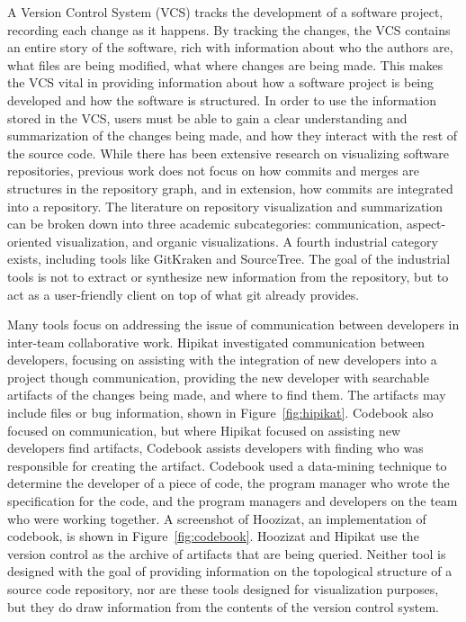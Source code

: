 A Version Control System (VCS) tracks the development of a software project,
recording each change as it happens. By tracking the changes, the VCS
contains an entire story of the software, rich with information about
who the authors are, what files are being modified, what where changes
are being made. This makes the VCS vital in providing information about
how a software project is being developed and how the software is
structured. In order to use the information stored in the VCS, users
must be able to gain a clear understanding and summarization of the
changes being made, and how they interact with the rest of the source
code. While there has been extensive research on visualizing software
repositories, previous work does not focus on how commits and merges are
structures in the repository graph, and in extension, how commits are
integrated into a repository. The literature on repository visualization
and summarization can be broken down into three academic subcategories:
communication\cite{Cubranic2005,Begel2010}, aspect-oriented
visualization\cite{Ambros2005,Burch2005,Ambros2009}, and organic
visualizations\cite{ogawa09,Caudwell2010}. A fourth industrial category
exists, including tools like GitKraken and SourceTree. The goal of the
industrial tools is not to extract or synthesize new information from
the repository, but to act as a user-friendly client on top of what git
already provides.

Many tools focus on addressing the issue of communication between
developers in inter-team collaborative work. Hipikat\cite{Cubranic2005}
investigated communication between developers, focusing on assisting
with the integration of new developers into a project though
communication, providing the new developer with searchable artifacts of
the changes being made, and where to find them. The artifacts may
include files or bug information, shown in Figure~\ref{fig:hipikat}.
Codebook\cite{Begel2010} also focused on communication, but where
Hipikat focused on assisting new developers find artifacts, Codebook
assists developers with finding who was responsible for creating the
artifact. Codebook used a data-mining technique to determine the
developer of a piece of code, the program manager who wrote the
specification for the code, and the program managers and developers on
the team who were working together. A screenshot of Hoozizat, an
implementation of codebook, is shown in Figure~\ref{fig:codebook}.
Hoozizat and Hipikat use the version control as the archive of artifacts
that are being queried. Neither tool is designed with the goal of
providing information on the topological structure of a source code
repository, nor are these tools designed for visualization purposes, but
they do draw information from the contents of the version control
system.

